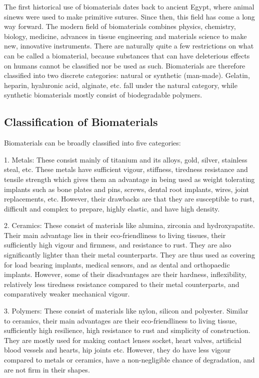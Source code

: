 \documentclass[11pt]{article}
\begin{document}
The first historical use of biomaterials dates back to ancient Egypt, where animal sinews were used to make primitive sutures. Since then, this field has come a long way forward. The modern field of biomaterials combines physics, chemistry, biology, medicine, advances in tissue engineering and materials science to make new, innovative instruments. There are naturally quite a few restrictions on what can be called a biomaterial, because substances that can have deleterious effects on humans cannot be classified nor be used as such. Biomaterials are therefore classified into two discrete categories: natural or synthetic (man-made). Gelatin, heparin, hyaluronic acid, alginate, etc. fall under the natural category, while synthetic biomaterials mostly consist of biodegradable polymers. 

\subsection*{Classification of Biomaterials}

Biomaterials can be broadly classified into five categories:

1. Metals: These consist mainly of titanium and its alloys, gold, silver, stainless steal, etc. These metals have sufficient vigour, stiffness, tiredness resistance and tensile strength which gives them an advantage in being used as weight tolerating implants such as bone plates and pins, screws, dental root implants, wires, joint replacements, etc. However, their drawbacks are that they are susceptible to rust, difficult and complex to prepare, highly elastic, and have high density.

2. Ceramics: These consist of materials like alumina, zirconia and hydroxyapatite. Their main advantage lies in their eco-friendliness to living tissues, their sufficiently high vigour and firmness, and resistance to rust. They are also significantly lighter than their metal counterparts. They are thus used as covering for load bearing implants, medical sensors, and as dental and orthopaedic implants. However, some of their disadvantages are their hardness, inflexibility, relatively less tiredness resistance compared to their metal counterparts, and comparatively weaker mechanical vigour.

3. Polymers: These consist of materials like nylon, silicon and polyester. Similar to ceramics, their main advantages are their eco-friendliness to living tissue, sufficiently high resilience, high resistance to rust and simplicity of construction. They are mostly used for making contact lenses socket, heart valves, artificial blood vessels and hearts, hip joints etc. However, they do have less vigour compared to metals or ceramics, have a non-negligible chance of degradation, and are not firm in their shapes.
\end{document}
